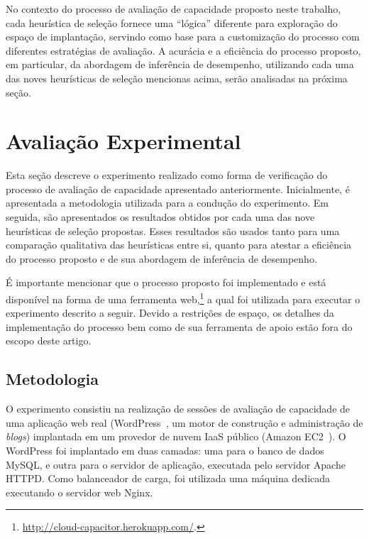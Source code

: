 \documentclass[12pt]{article}
\begin{document}
No contexto do processo de avaliação de capacidade proposto neste trabalho, cada heurística de seleção fornece uma ``lógica'' diferente para exploração do espaço de implantação, servindo como base para a customização do processo com diferentes estratégias de avaliação. A acurácia e a eficiência do processo proposto, em particular, da abordagem de inferência de desempenho, utilizando cada uma das noves heurísticas de seleção mencionas acima, serão analisadas na próxima seção. 



\section{Avaliação Experimental}\label{sec:experiments}

Esta seção descreve o experimento realizado como forma de verificação do processo de avaliação de capacidade apresentado anteriormente. Inicialmente, é apresentada a metodologia utilizada para a condução do experimento. Em seguida, são apresentados os resultados obtidos por cada uma das nove heurísticas de seleção propostas. Esses resultados são usados tanto para uma comparação qualitativa das heurísticas entre si, quanto para atestar
a eficiência do processo proposto e de sua abordagem de inferência de desempenho. 

É importante mencionar que o processo proposto foi implementado e está disponível na forma de uma ferramenta web,\footnote{\url{http://cloud-capacitor.herokuapp.com/}.} a qual foi utilizada para executar o experimento descrito a seguir. Devido a restrições de espaço, os detalhes da implementação do processo bem como de sua ferramenta de apoio estão fora do escopo deste artigo.

\subsection{Metodologia}

O experimento consistiu na realização de sessões de avaliação de
capacidade de uma aplicação web real (WordPress~\cite{wordpress}, um motor de construção 
e administração de \emph{blogs}) implantada em um provedor de nuvem IaaS público (Amazon EC2~\cite{ec2}). O WordPress foi implantado em duas camadas: uma para o banco de  dados MySQL, e outra para o servidor de aplicação, executada pelo servidor Apache HTTPD. Como balanceador de carga, foi utilizada uma máquina dedicada executando o servidor web Nginx. 
\end{document}
